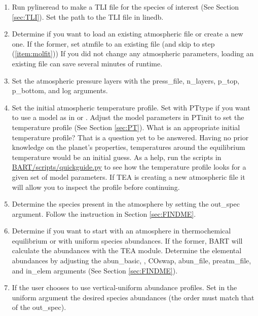 \documentclass[letterpaper, 12pt]{article}
\begin{document}
\begin{enumerate}
\item Run pylineread to make a TLI file for the species of interest
(See Section \ref{sec:TLI}).  Set the path to the TLI file in {\tttb linedb}.

\item Determine if you want to load an existing atmospheric file
or create a new one.  If the former, set {\tttb atmfile} to an existing file (and skip to step (\ref{item:molfit})) If you did not change any atmospheric parameters, loading an existing file can save several minutes of runtime.

\item Set the atmospheric pressure layers with the {\tttb press\_file}, 
{\tttb n\_layers},  {\tttb p\_top}, {\tttb p\_bottom}, and {\tttb log}
arguments.

\item Set the initial atmospheric temperature profile.  Set with {\tttm PTtype} if you want to use a model as in \citet{LineEtal2013apjRetrievalI} or  \citet{MadhusudhanSeager2009ApJ-AbundanceMethod}.  Adjust the model parameters in {\tttb PTinit} to set the temperature profile (See Section \ref{sec:PT}).  What is an appropriate initial temperature profile? That is a question yet to be answered.  Having no prior knowledge on the planet's properties, temperatures around the equilibrium temperature would be an initial guess. As a help, run the scripts in \href{https://github.com/exosports/BART/blob/master/scripts/quickguide.py}{BART/scripts/quickguide.py} to see how the temperature profile looks for a given set of model parameters. If TEA is creating a new atmospheric file it will allow you to inspect the profile before continuing.

\item Determine the species present in the atmosphere by setting the
{\tttb out\_spec} argument.  Follow the instruction in Section
\ref{sec:FINDME}.

\item Determine if you want to start with an atmosphere in
thermochemical equilibrium or with uniform species abundances.  
If the former, BART will calculate the abundances with the TEA module.
Determine the elemental abundances by adjusting the {\tttb abun\_basic},
, {\tttb COswap}, {\tttb abun\_file},
{\tttb preatm\_file}, and {\tttb in\_elem} arguments (See Section
\ref{sec:FINDME}).

\item If the user chooses to use vertical-uniform abundance profiles.
Set in the {\tttb uniform} argument the desired species abundances
(the order must match that of the {\tttb out\_spec}).


\end{enumerate}
\end{document}
